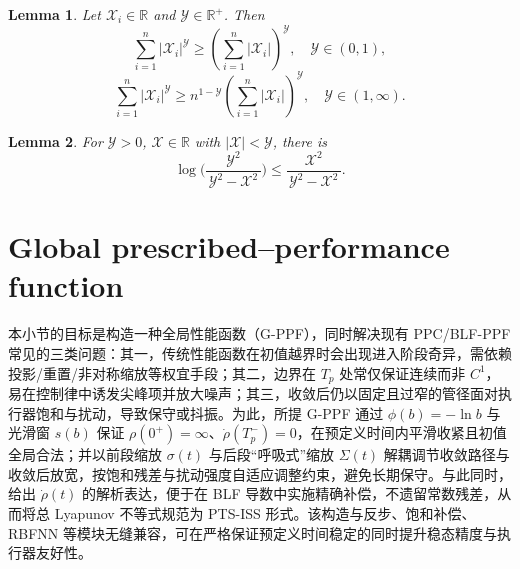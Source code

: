 \documentclass[pdflatex,sn-mathphys-num]{sn-jnl}%
\theoremstyle{thmstyleone}%
\newtheorem{lemma}{Lemma}
\theoremstyle{thmstyletwo}%
\theoremstyle{thmstylethree}%
\begin{document}
\begin{lemma} \label{lemma:3}\cite{HardyLittlewoodPolya_1952_Inequalities} Let $\mathcal{X}_i\in\mathbb{R}$ and $\mathcal{Y}\in\mathbb{R}^+$. Then
	\begin{equation}\label{eq:11}
		\sum_{i=1}^{n}|\mathcal{X}_i|^{\mathcal{Y} } \geq \left(\sum_{i=1}^{n}|\mathcal{X}_i|\right)^{\mathcal{Y} }, \quad \mathcal{Y}  \in (0,1) ,
	\end{equation}
	\begin{equation}\label{eq:12}
		\sum_{i=1}^{n}|\mathcal{X}_i|^{\mathcal{Y} } \geq n^{1-\mathcal{Y} }\left(\sum_{i=1}^{n}|\mathcal{X}_i|\right)^{\mathcal{Y} }, \quad \mathcal{Y}  \in (1,\infty) .
	\end{equation}
\end{lemma}
\begin{lemma}	\label{lemma:4}\cite{TeeEtAl_2009_Barrierlyapunov}
	For \(\mathcal{Y} >0\), \(\mathcal{X}\in \mathbb R\) with \(\lvert \mathcal{X}\rvert < \mathcal{Y} \), there is
\begin{equation}\label{eq:13}
		\log\!\biggl(\frac{\mathcal{Y} ^2}{\,\mathcal{Y} ^2 - \mathcal{X}^2\,}\biggr)
		\le
		\frac{\mathcal{X}^2}{\,\mathcal{Y} ^2 - \mathcal{X}^2\,}.
	\end{equation}
\end{lemma}



\section{Global prescribed–performance function}


本小节的目标是构造一种全局性能函数（G-PPF），同时解决现有 PPC/BLF-PPF 常见的三类问题：其一，传统性能函数在初值越界时会出现进入阶段奇异，需依赖投影/重置/非对称缩放等权宜手段；其二，边界在 $T_p$ 处常仅保证连续而非 $C^1$，易在控制律中诱发尖峰项并放大噪声；其三，收敛后仍以固定且过窄的管径面对执行器饱和与扰动，导致保守或抖振。为此，所提 G-PPF 通过 $\phi(b)=-\ln b$ 与光滑窗 $s(b)$ 保证 $\rho(0^+)=\infty$、$\dot\rho(T_p^-)=0$，在预定义时间内平滑收紧且初值全局合法；并以前段缩放 $\sigma(t)$ 与后段“呼吸式”缩放 $\Sigma(t)$ 解耦调节收敛路径与收敛后放宽，按饱和残差与扰动强度自适应调整约束，避免长期保守。与此同时，给出 $\dot\rho(t)$ 的解析表达，便于在 BLF 导数中实施精确补偿，不遗留常数残差，从而将总 Lyapunov 不等式规范为 PTS-ISS 形式。该构造与反步、饱和补偿、RBFNN 等模块无缝兼容，可在严格保证预定义时间稳定的同时提升稳态精度与执行器友好性。
\end{document}
